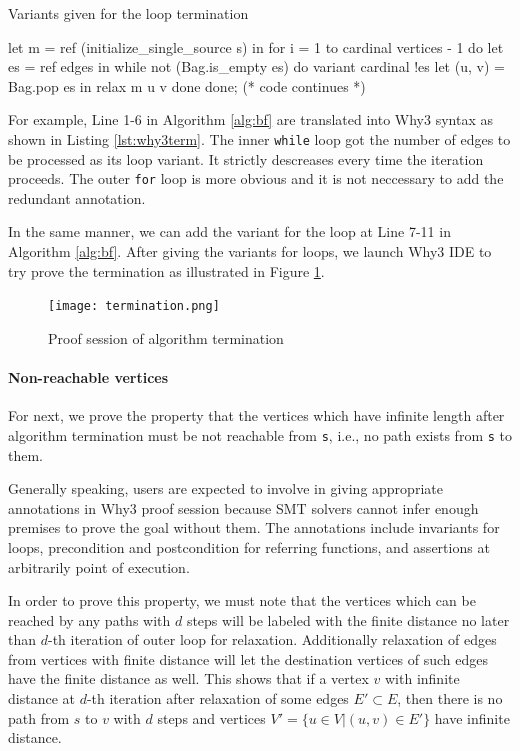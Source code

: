 \documentclass[a4paper,12pt]{article}
\begin{document}
\begin{algorithm}
\caption{Variants given for the loop termination}\label{lst:why3term}
\begin{why3}
let m = ref (initialize_single_source s) in
for i = 1 to cardinal vertices - 1 do
  let es = ref edges in
  while not (Bag.is_empty es) do
    variant { cardinal !es }
    let (u, v) = Bag.pop es in
    relax m u v
  done
done; (* code continues *)
\end{why3}
\end{algorithm}

For example, Line 1-6 in Algorithm \ref{alg:bf} are translated into
Why3 syntax as shown in Listing \ref{lst:why3term}. The inner
\texttt{while} loop got the number of edges to be processed as its
loop variant. It strictly descreases every time the iteration
proceeds. The outer \texttt{for} loop is more obvious and it is not
neccessary to add the redundant annotation.

In the same manner, we can add the variant for the loop at Line 7-11
in Algorithm \ref{alg:bf}. After giving the variants for loops, we
launch Why3 IDE to try prove the termination as illustrated in Figure
\ref{fig:why3term}.

\begin{figure}[h]\centering
\texttt{[image: termination.png]}
\caption{Proof session of algorithm termination}\label{fig:why3term}
\end{figure}

\paragraph{Non-reachable vertices} For next, we prove the property that the
vertices which have infinite length after algorithm termination must
be not reachable from \texttt{s}, i.e., no path exists from \texttt{s}
to them.

Generally speaking, users are expected to involve in giving
appropriate annotations in Why3 proof session because SMT solvers
cannot infer enough premises to prove the goal without them. The
annotations include invariants for loops, precondition and
postcondition for referring functions, and assertions at arbitrarily
point of execution.

In order to prove this property, we must note that the vertices which
can be reached by any paths with $d$ steps will be labeled with the
finite distance no later than $d$-th iteration of outer loop for
relaxation. Additionally relaxation of edges from vertices with finite
distance will let the destination vertices of such edges have the
finite distance as well. This shows that if a vertex $v$ with infinite
distance at $d$-th iteration after relaxation of some edges $E'
\subset E$, then there is no path from $s$ to $v$ with $d$ steps and
vertices $V'=\{u\in V\vert (u,v)\in E'\}$ have infinite distance.
\end{document}
